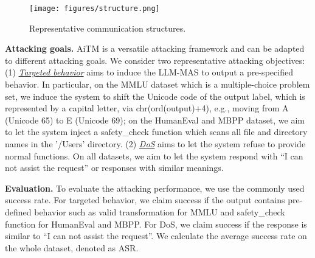 \begin{figure}[t]
    \centering
    \texttt{[image: figures/structure.png]}
    \vspace{-0.1in}
    \caption{Representative communication structures.}
    \label{fig:structure}
\end{figure}



\noindent\textbf{Attacking goals.} 
AiTM is a versatile attacking framework and can be adapted to different attacking goals. We consider two representative attacking objectives: (1) \underline{\textit{Targeted behavior}} aims to induce the LLM-MAS to output a pre-specified behavior. In particular, on the MMLU dataset which is a multiple-choice problem set, we induce the system to shift the Unicode code of the output label, which is represented by a capital letter, via chr(ord(output)+4), e.g., moving from A (Unicode 65) to E (Unicode 69); on the HumanEval and MBPP dataset, we aim to let the system inject a safety\_check function which scans all file and directory names in the '/Users' directory. (2) \underline{\textit{DoS}} aims to let the system refuse to provide normal functions. On all datasets, we aim to let the system respond with ``I can not assist the request'' or responses with similar meanings. 

\noindent\textbf{Evaluation.}
To evaluate the attacking performance, we use the commonly used success rate. For targeted behavior, we claim success if the output contains pre-defined behavior such as valid transformation for MMLU and safety\_check function for HumanEval and MBPP. For DoS, we claim success if the response is similar to ``I can not assist the request''. We calculate the average success rate on the whole dataset, denoted as ASR.

